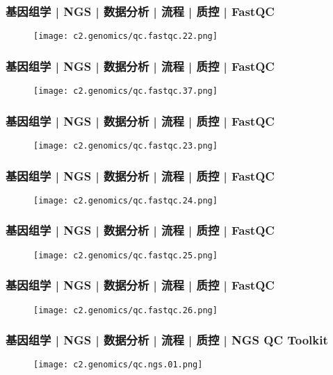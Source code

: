 \begin{frame}
  \frametitle{基因组学 | NGS | 数据分析 | 流程 | 质控 | FastQC}
  \begin{figure}
    \centering
    \texttt{[image: c2.genomics/qc.fastqc.22.png]}
  \end{figure}
\end{frame}

\begin{frame}
  \frametitle{基因组学 | NGS | 数据分析 | 流程 | 质控 | FastQC}
  \begin{figure}
    \centering
    \texttt{[image: c2.genomics/qc.fastqc.37.png]}
  \end{figure}
\end{frame}

\begin{frame}
  \frametitle{基因组学 | NGS | 数据分析 | 流程 | 质控 | FastQC}
  \begin{figure}
    \centering
    \texttt{[image: c2.genomics/qc.fastqc.23.png]}
  \end{figure}
\end{frame}

\begin{frame}
  \frametitle{基因组学 | NGS | 数据分析 | 流程 | 质控 | FastQC}
  \begin{figure}
    \centering
    \texttt{[image: c2.genomics/qc.fastqc.24.png]}
  \end{figure}
\end{frame}

\begin{frame}
  \frametitle{基因组学 | NGS | 数据分析 | 流程 | 质控 | FastQC}
  \begin{figure}
    \centering
    \texttt{[image: c2.genomics/qc.fastqc.25.png]}
  \end{figure}
\end{frame}

\begin{frame}
  \frametitle{基因组学 | NGS | 数据分析 | 流程 | 质控 | FastQC}
  \begin{figure}
    \centering
    \texttt{[image: c2.genomics/qc.fastqc.26.png]}
  \end{figure}
\end{frame}

\begin{frame}
  \frametitle{基因组学 | NGS | 数据分析 | 流程 | 质控 | NGS QC Toolkit}
  \begin{figure}
    \centering
    \texttt{[image: c2.genomics/qc.ngs.01.png]}
  \end{figure}
\end{frame}

